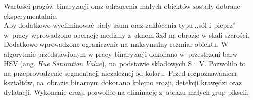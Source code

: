 Wartości progów binaryzacji oraz odrzucenia małych obiektów zostały dobrane eksperymentalnie.\\ 
Aby dodatkowo wyeliminować biały szum oraz zakłócenia typu ,,sól i~pieprz'' w~pracy \cite{H_median} wprowadzono operację mediany z~oknem 3x3 na obrazie w skali szarości. 
Dodatkowo wprowadzono ograniczenie na maksymalny rozmiar obiektu. 
W algorytmie przedstawionym w pracy \cite{FPGA} binaryzacji dokonano w~przestrzeni barw HSV (ang. \textit{Hue Saturation Value}), na~podstawie składowych S i~V. 
Pozwoliło to na przeprowadzenie segmentacji niezależnej od koloru. 
Przed rozpoznawaniem kształtów, na~obrazie binarnym dokonano kolejno erozji, detekcji krawędzi oraz dylatacji. 
Wykonanie erozji pozwoliło na eliminację z~obrazu małych grup pikseli. \par %

